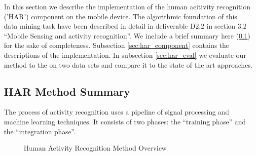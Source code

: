 \label{sec:HAR}

\newcommand{\IR}{\mathbb{R}}

In this section we describe the implementation of the human acitivity
recognition ('HAR') component on the mobile device.  The algorithmic
foundation of this data mining task have been described in detail in
deliverable D2.2 in section 3.2 ``Mobile Sensing and activity
recognition''. We include a brief summary here (\ref{sec:har_method})
for the sake of completeness. Subsection \ref{sec:har_component}
contains the descriptions of the implementation. In subsection
\ref{sec:har_eval} we evaluate our method to the on two data sets and
compare it to the state of the art approaches.

\subsection{HAR Method Summary}\label{sec:har_method}

The process of activity recognition uses a pipeline of signal
processing and machine learning techniques. It consists of two phases:
the ``training phase'' and the ``integration phase''. 

\begin{figure}[htbp]
\centering
{} \hspace{1cm}
\caption{Human Activity Recognition Method Overview}
\label{fig:HAR_PHASES}
\end{figure}

